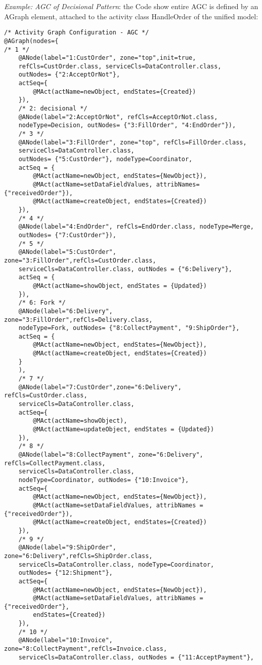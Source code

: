 \textit{Example: AGC of Decisional Pattern}: the Code show entire AGC is defined by an AGraph element, attached to the activity class HandleOrder of the unified model:
\begin{verbatim}
/* Activity Graph Configuration - AGC */
@AGraph(nodes={
/* 1 */  
	@ANode(label="1:CustOrder", zone="top",init=true, 
	refCls=CustOrder.class, serviceCls=DataController.class, 
	outNodes= {"2:AcceptOrNot"},
	actSeq={
		@MAct(actName=newObject, endStates={Created})
	}),
	/* 2: decisional */    
	@ANode(label="2:AcceptOrNot", refCls=AcceptOrNot.class,
	nodeType=Decision, outNodes= {"3:FillOrder", "4:EndOrder"}),
	/* 3 */    
	@ANode(label="3:FillOrder", zone="top", refCls=FillOrder.class,
	serviceCls=DataController.class,
	outNodes= {"5:CustOrder"}, nodeType=Coordinator,
	actSeq = {
		@MAct(actName=newObject, endStates={NewObject}),
		@MAct(actName=setDataFieldValues, attribNames={"receivedOrder"}),
		@MAct(actName=createObject, endStates={Created})
	}),
	/* 4 */    
	@ANode(label="4:EndOrder", refCls=EndOrder.class, nodeType=Merge,
	outNodes= {"7:CustOrder"}),
	/* 5 */    
	@ANode(label="5:CustOrder", zone="3:FillOrder",refCls=CustOrder.class,
	serviceCls=DataController.class, outNodes = {"6:Delivery"},
	actSeq = {
		@MAct(actName=showObject, endStates = {Updated})
	}),
	/* 6: Fork */    
	@ANode(label="6:Delivery", zone="3:FillOrder",refCls=Delivery.class, 
	nodeType=Fork, outNodes= {"8:CollectPayment", "9:ShipOrder"},
	actSeq = {
		@MAct(actName=newObject, endStates={NewObject}),
		@MAct(actName=createObject, endStates={Created})      
	}
	),
	/* 7 */    
	@ANode(label="7:CustOrder",zone="6:Delivery", refCls=CustOrder.class,
	serviceCls=DataController.class, 
	actSeq={
		@MAct(actName=showObject),
		@MAct(actName=updateObject, endStates = {Updated})
	}),
	/* 8 */    
	@ANode(label="8:CollectPayment", zone="6:Delivery", refCls=CollectPayment.class, 
	serviceCls=DataController.class,
	nodeType=Coordinator, outNodes= {"10:Invoice"},
	actSeq={
		@MAct(actName=newObject, endStates={NewObject}),
		@MAct(actName=setDataFieldValues, attribNames = {"receivedOrder"}),
		@MAct(actName=createObject, endStates={Created})
	}),
	/* 9 */    
	@ANode(label="9:ShipOrder", zone="6:Delivery",refCls=ShipOrder.class,
	serviceCls=DataController.class, nodeType=Coordinator, 
	outNodes= {"12:Shipment"},
	actSeq={
		@MAct(actName=newObject, endStates={NewObject}),
		@MAct(actName=setDataFieldValues, attribNames = {"receivedOrder"},
		endStates={Created})
	}),
	/* 10 */    
	@ANode(label="10:Invoice", zone="8:CollectPayment",refCls=Invoice.class,
	serviceCls=DataController.class, outNodes = {"11:AcceptPayment"},

\end{verbatim}
